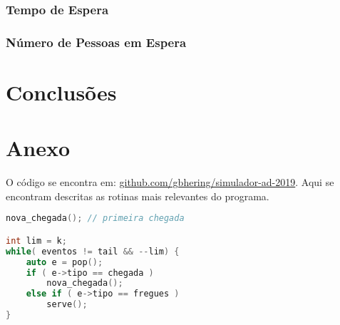 \documentclass{article}
\begin{document}
\subsubsection{Tempo de Espera}
\subsubsection{Número de Pessoas em Espera}

\section{Conclusões}

\section{Anexo}

O código se encontra em: \url{github.com/gbhering/simulador-ad-2019}. Aqui se encontram descritas as rotinas mais relevantes do programa.

\begin{lstlisting}[language=C++, caption={Loop principal do programa}]
nova_chegada(); // primeira chegada

int lim = k;
while( eventos != tail && --lim) {
	auto e = pop();
	if ( e->tipo == chegada )
		nova_chegada();
	else if ( e->tipo == fregues )
		serve();
}
\end{lstlisting}
\end{document}
